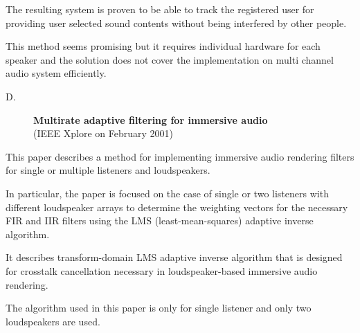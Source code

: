 \documentclass[../../../patent_v1.tex]{subfiles}
\begin{document}
The resulting system is proven to be able to track the registered user 
for providing user selected sound contents without being interfered 
by other people.

This method seems promising but it requires individual hardware for 
each speaker and the solution does not cover the implementation on 
multi channel audio system efficiently.

\begin{description}
    \item[D.]\textbf{Multirate adaptive filtering for immersive audio}\\(IEEE Xplore  on February 2001)
\end{description}

This paper describes a method for implementing immersive audio 
rendering filters for single or multiple listeners and loudspeakers.

In particular, the paper is focused on the case of single or two 
listeners with different loudspeaker arrays to determine the weighting 
vectors for the necessary FIR and IIR filters using the LMS (least-mean-squares) 
adaptive inverse algorithm.

It describes transform-domain LMS adaptive inverse algorithm that is 
designed for crosstalk cancellation necessary in loudspeaker-based 
immersive audio rendering. 

The algorithm used in this paper is only for single listener and 
only two loudspeakers are used.
\end{document}
